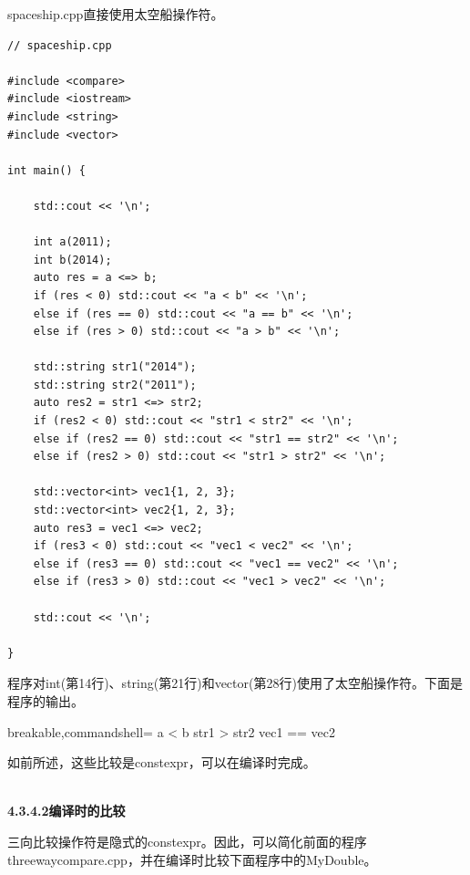 spaceship.cpp直接使用太空船操作符。

\begin{lstlisting}[style=styleCXX]
// spaceship.cpp

#include <compare>
#include <iostream>
#include <string>
#include <vector>

int main() {
	
	std::cout << '\n';
	
	int a(2011);
	int b(2014);
	auto res = a <=> b;
	if (res < 0) std::cout << "a < b" << '\n';
	else if (res == 0) std::cout << "a == b" << '\n';
	else if (res > 0) std::cout << "a > b" << '\n';
	
	std::string str1("2014");
	std::string str2("2011");
	auto res2 = str1 <=> str2;
	if (res2 < 0) std::cout << "str1 < str2" << '\n';
	else if (res2 == 0) std::cout << "str1 == str2" << '\n';
	else if (res2 > 0) std::cout << "str1 > str2" << '\n';
	
	std::vector<int> vec1{1, 2, 3};
	std::vector<int> vec2{1, 2, 3};
	auto res3 = vec1 <=> vec2;
	if (res3 < 0) std::cout << "vec1 < vec2" << '\n';
	else if (res3 == 0) std::cout << "vec1 == vec2" << '\n';
	else if (res3 > 0) std::cout << "vec1 > vec2" << '\n';
	
	std::cout << '\n';

}
\end{lstlisting}

程序对int(第14行)、string(第21行)和vector(第28行)使用了太空船操作符。下面是程序的输出。

\begin{tcblisting}{breakable,commandshell={}}
a < b
str1 > str2
vec1 == vec2
\end{tcblisting}

如前所述，这些比较是constexpr，可以在编译时完成。

\hspace*{\fill} \\ %
\noindent
\textbf{4.3.4.2\hspace{0.2cm}编译时的比较}

三向比较操作符是隐式的constexpr。因此，可以简化前面的程序threewaycompare.cpp，并在编译时比较下面程序中的MyDouble。

